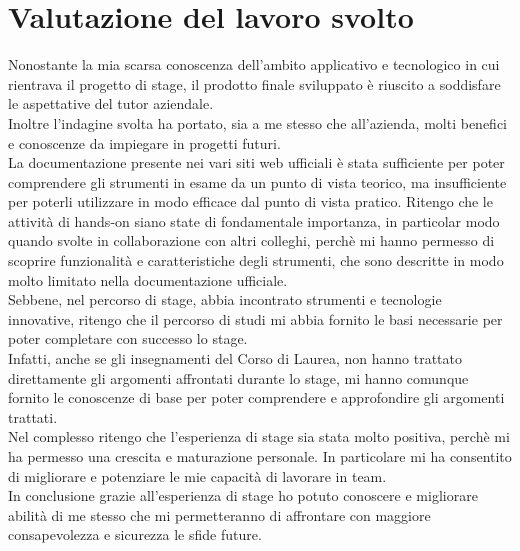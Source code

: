 \section{Valutazione del lavoro svolto}
Nonostante la mia scarsa conoscenza dell'ambito applicativo e tecnologico in cui rientrava il progetto di stage,
il prodotto finale sviluppato è riuscito a soddisfare le aspettative del tutor aziendale.\\
Inoltre l'indagine svolta 
ha portato, sia a me stesso che all'azienda,
 molti benefici e conoscenze da impiegare in progetti futuri.\\
La documentazione presente nei vari siti web ufficiali è stata sufficiente per poter comprendere gli strumenti in esame
da un punto di vista teorico, ma insufficiente 
per poterli utilizzare in modo efficace dal punto di vista pratico. Ritengo che 
le attività di \gls{hands-on}{} siano state di fondamentale importanza, in particolar modo 
quando svolte in collaborazione con altri colleghi, perchè mi hanno permesso di 
scoprire funzionalità e caratteristiche degli strumenti, che sono descritte in modo molto limitato nella documentazione ufficiale.\\
Sebbene, nel percorso di stage, abbia incontrato strumenti e tecnologie innovative, ritengo che il percorso di studi 
mi abbia fornito le basi necessarie per poter completare con successo lo stage.\\
Infatti, anche se gli insegnamenti del Corso di Laurea, non hanno trattato direttamente gli argomenti affrontati durante lo stage,
mi hanno comunque fornito le conoscenze di base per poter comprendere e approfondire gli argomenti trattati.\\
Nel complesso ritengo che l'esperienza di stage sia stata molto positiva, perchè 
mi ha permesso una crescita e maturazione personale. In particolare mi ha consentito di
migliorare e potenziare le mie capacità di lavorare in team.\\
In conclusione grazie all'esperienza di stage ho potuto conoscere e migliorare abilità di me stesso
 che mi permetteranno di affrontare con maggiore consapevolezza e sicurezza le sfide future.\\
\newpage
\pagestyle{empty}
\null %
\newpage